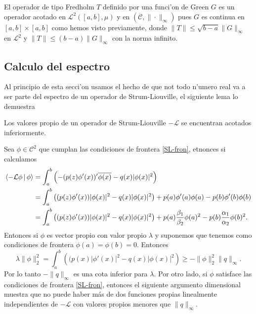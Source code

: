\documentclass[main.tex]{subfiles}
\begin{document}
\obs El operador de tipo Fredholm $T$ definido por una funci'on de Green $G$ es un operador acotado en $\mathcal{L}^{2}([a,b],\mu)$ y en $(\mathcal{C},\|\cdot\|_{\infty})$ pues $G$ es continua en $[a,b]\times[a,b]$ como hemos visto previamente, donde $\|T\|\leq\sqrt{b-a}\|G\|_{\infty}$ en $\mathcal{L}^{2}$ y $\|T\|\leq(b-a)\|G\|_{\infty}$ con la norma infinito.

\subsection{Calculo del espectro}
\noindent Al principio de esta secci'on usamos el hecho de que not todo n'umero real va a ser parte del espectro de un operador de Strum-Liouville, el siguiente lema lo demuestra
\begin{lema}
  Los valores propio de un operador de Strum-Liouville $-\mathcal{L}$ se encuentran acotados inferiormente.
  \end{lema}
  \dem Sea $\phi\in\mathcal{C}^{2}$ que cumplan las condiciones de frontera \ref{SL-fron}, etnonces si calculamos
  \begin{align*}  \braket{-\mathcal{L}\phi\,|\,\phi}&=\int_{a}^{b}\left(-(p(z)\phi'(x))'\overline{\phi(x)}-q(x)|\phi(x)|^{2}\right)\\
                              &=\int_{a}^{b}\left((p(z)\phi'(x))|\phi(x)|^{2}-q(x)|\phi(x)|^{2}\right)
                                                +p(a)\phi'(a)\phi(a)-p(b)\phi'(b)\phi(b)\\
                              &=\int_{a}^{b}\left((p(z)\phi'(x))|\phi(x)|^{2}-q(x)|\phi(x)|^{2}\right)
                              +p(a)\frac{\beta_{1}}{\beta_{2}}\phi(a)^{2}-p(b)\frac{\alpha_{1}}{\alpha_{2}}\phi(b)^{2}.
  \end{align*}
  Entonces si $\phi$ es vector propio con valor propio $\lambda$ y suponemos que tenemos como condiciones de frontera $\phi(a)=\phi(b)=0.$ Entonces
  \[
    \lambda\|\phi\|_{2}^{2}=\int_{a}^{b}\left((p(x)|\phi'(x)|^{2}-q(x)|\phi(x)|^{2}\right)\geq-\|\phi\|^{2}_{2}\|q\|_{\infty}.
  \]
  Por lo tanto $-\|q\|_{\infty}$ es una cota inferior para $\lambda$. Por otro lado, si $\phi$ satisface las condiciones de frontera \ref{SL-fron},
entonces el siguiente argumento dimensional muestra que no puede haber más de dos funciones propias linealmente independientes de $-\mathcal{L}$ con valores propios menores que $\|q\|_{\infty}$.
\end{document}
